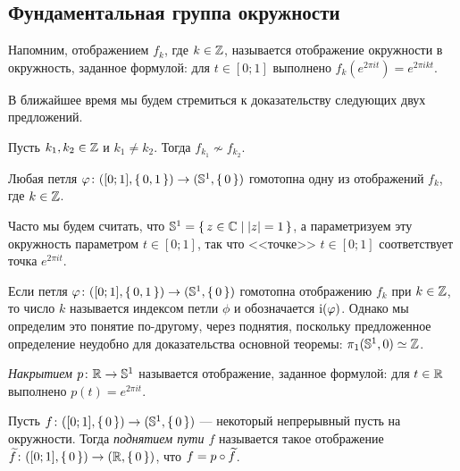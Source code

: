 \documentclass[main]{subfiles}
\begin{document}
\subsection{Фундаментальная группа окружности}

\begin{remark}
	Напомним, отображением $ f_k $, где $ k \in \mathbb{Z} $, называется отображение окружности в окружность, заданное
	формулой: для $ t \in [0; 1] $ выполнено $ f_k( e^{2 \pi i t}) = e^{2 \pi i k t} $.
\end{remark}

В ближайшее время мы будем стремиться к доказательству следующих двух предложений.

\begin{proposition*}
	Пусть $ k_1, k_2 \in \mathbb{Z} $ и $ k_1 \neq k_2 $. Тогда $ f_{k_1} \not \sim f_{k_2} $.
\end{proposition*}

\begin{proposition*}
	Любая петля $ \varphi \colon ([0; 1], \left\{\,0, 1\,\right\}) \to (\mathbb{S}^1, \left\{\,0\,\right\})$ гомотопна одну из отображений $ f_k $, где
	$ k \in \mathbb{Z} $.
\end{proposition*}

\begin{remark}
	Часто мы будем считать, что $ \mathbb{S}^1 = \left\{\, z \in \mathbb{C} \mid \left\vert z\right\vert = 1 \,\right\} $, а параметризуем эту окружность
	параметром $ t \in [0; 1] $, так что <<точке>> $ t \in [0; 1] $ соответствует точка $ e^{2 \pi i t} $.
\end{remark}

\begin{remark}
	Если петля $ \varphi \colon ([0; 1], \left\{\,0, 1\,\right\}) \to (\mathbb{S}^1, \left\{\,0\,\right\})$ гомотопна отображению $ f_k $ при $ k \in \mathbb{Z} $,
	то число $ k $ называется индексом петли $ \phi $ и обозначается $ \operatorname{i}(\varphi) $. Однако мы определим это понятие
	по-другому, через поднятия, поскольку предложенное определение неудобно для доказательства основной теоремы:
	$ \pi_1(\mathbb{S}^1, 0) \simeq \mathbb{Z} $.
\end{remark}

\begin{definition}
	\emph{Накрытием $ p \colon \mathbb{R} \to \mathbb{S}^1 $} называется отображение, заданное формулой: для $ t \in \mathbb{R} $ выполнено
	$ p(t) = e^{2 \pi i t} $.
\end{definition}

\begin{definition}
	Пусть $ f \colon ([0; 1], \left\{\,0\,\right\}) \to (\mathbb{S}^1, \left\{\,0\,\right\}) $ --- некоторый непрерывный пусть на окружности.
	Тогда \emph{поднятием пути $ f $} называется такое отображение
	$ \widetilde{f} \colon ([0; 1], \left\{\,0\,\right\}) \to (\mathbb{R}, \left\{\,0\,\right\}) $, что $ f = p \circ \widetilde{f} $.
\end{definition}
\end{document}
